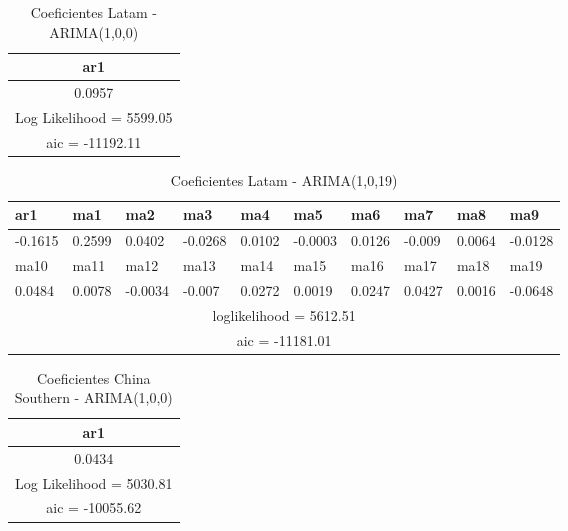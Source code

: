 \documentclass[12pt]{article}
\begin{document}
\begin{table}[H]
	\centering
	\begin{tabular}{|c|}
		\hline
		ar1                      \\ \hline
		0.0957                   \\ \hline
		Log Likelihood = 5599.05 \\ \hline
		aic = -11192.11          \\ \hline
	\end{tabular}
\caption{Coeficientes Latam - ARIMA(1,0,0)}
\label{tab:Latam100}
\end{table}

\begin{table}[H]
	\centering
	\begin{tabular}{|l|l|l|l|l|l|l|l|l|l|}
		\hline
		ar1    & ma1    & ma2     & ma3     & ma4     & ma5    & ma6     & ma7     & ma8     & ma9   \\ \hline
		-0.1615 & 0.2599  & 0.0402 & -0.0268  & 0.0102 & -0.0003 & 0.0126 & -0.009  & 0.0064  & -0.0128 \\ \hline
		ma10   & ma11   & ma12    & ma13    & ma14     & ma15     & ma16     & ma17     & ma18     & ma19    \\ \hline
		0.0484 & 0.0078 &-0.0034 & -0.007 & 0.0272 & 0.0019 & 0.0247 & 0.0427 & 0.0016 & -0.0648 \\ \hline
		\multicolumn{10}{|c|}{loglikelihood = 5612.51}                                                 \\ \hline
		\multicolumn{10}{|c|}{aic = -11181.01}                                                         \\ \hline
	\end{tabular}
	\caption{Coeficientes Latam - ARIMA(1,0,19)}
	\label{tab:Latam1019}
\end{table}

\begin{table}[H]
	\centering
	\begin{tabular}{|c|}
		\hline
		ar1                      \\ \hline
		0.0434                   \\ \hline
		Log Likelihood = 5030.81 \\ \hline
		aic = -10055.62          \\ \hline
	\end{tabular}
\caption{Coeficientes China Southern - ARIMA(1,0,0)}
\label{tab:ChinaSouth100}
\end{table}
\end{document}
